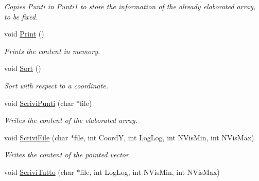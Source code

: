 \begin{DoxyCompactItemize}
\begin{DoxyCompactList}\small\item\em Copies Punti in Punti1 to store the information of the already elaborated array, to be fixed. \end{DoxyCompactList}\item 
void \hyperlink{classVarDatFile_a9dcac18006ce057b8d78c847174c1362}{Print} ()\hypertarget{classVarDatFile_a9dcac18006ce057b8d78c847174c1362}{}\label{classVarDatFile_a9dcac18006ce057b8d78c847174c1362}

\begin{DoxyCompactList}\small\item\em Prints the content in memory. \end{DoxyCompactList}\item 
void \hyperlink{classVarDatFile_ae424c3360277f457eba79fd25b4eed3b}{Sort} ()\hypertarget{classVarDatFile_ae424c3360277f457eba79fd25b4eed3b}{}\label{classVarDatFile_ae424c3360277f457eba79fd25b4eed3b}

\begin{DoxyCompactList}\small\item\em Sort with respect to a coordinate. \end{DoxyCompactList}\item 
void \hyperlink{classVarDatFile_a15ad052575da97bec5b2bad38a52385e}{Scrivi\+Punti} (char $\ast$file)\hypertarget{classVarDatFile_a15ad052575da97bec5b2bad38a52385e}{}\label{classVarDatFile_a15ad052575da97bec5b2bad38a52385e}

\begin{DoxyCompactList}\small\item\em Writes the content of the elaborated array. \end{DoxyCompactList}\item 
void \hyperlink{classVarDatFile_acc513a8bb6bda4c6bbf7832a9dcdd19a}{Scrivi\+File} (char $\ast$file, int CoordY, int Log\+Log, int N\+Vis\+Min, int N\+Vis\+Max)\hypertarget{classVarDatFile_acc513a8bb6bda4c6bbf7832a9dcdd19a}{}\label{classVarDatFile_acc513a8bb6bda4c6bbf7832a9dcdd19a}

\begin{DoxyCompactList}\small\item\em Writes the content of the pointed vector. \end{DoxyCompactList}\item 
void \hyperlink{classVarDatFile_aef5b55b7d54d1a01e9e507d3c4d23e4d}{Scrivi\+Tutto} (char $\ast$file, int Log\+Log, int N\+Vis\+Min, int N\+Vis\+Max)\hypertarget{classVarDatFile_aef5b55b7d54d1a01e9e507d3c4d23e4d}{}\label{classVarDatFile_aef5b55b7d54d1a01e9e507d3c4d23e4d}


\end{DoxyCompactItemize}
